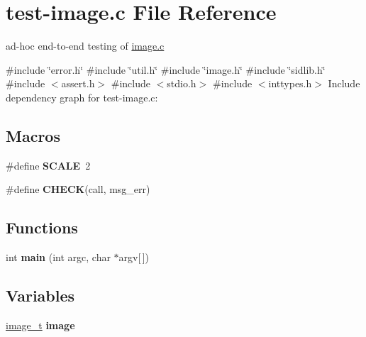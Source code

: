 \hypertarget{test-image_8c}{}\section{test-\/image.c File Reference}
\label{test-image_8c}


ad-\/hoc end-\/to-\/end testing of \hyperlink{image_8c}{image.\+c}  


{\ttfamily \#include \char`\"{}error.\+h\char`\"{}}\newline
{\ttfamily \#include \char`\"{}util.\+h\char`\"{}}\newline
{\ttfamily \#include \char`\"{}image.\+h\char`\"{}}\newline
{\ttfamily \#include \char`\"{}sidlib.\+h\char`\"{}}\newline
{\ttfamily \#include $<$assert.\+h$>$}\newline
{\ttfamily \#include $<$stdio.\+h$>$}\newline
{\ttfamily \#include $<$inttypes.\+h$>$}\newline
Include dependency graph for test-\/image.c\+:
\subsection*{Macros}
\begin{DoxyCompactItemize}
\item 
\mbox{\label{test-image_8c_a0cbea62f1ce2043dd08108e65ed8de1d}} 
\#define {\bfseries S\+C\+A\+LE}~2
\item 
\#define {\bfseries C\+H\+E\+CK}(call,  msg\+\_\+err)
\end{DoxyCompactItemize}
\subsection*{Functions}
\begin{DoxyCompactItemize}
\item 
\mbox{\label{test-image_8c_a0ddf1224851353fc92bfbff6f499fa97}} 
int {\bfseries main} (int argc, char $\ast$argv\mbox{[}$\,$\mbox{]})
\end{DoxyCompactItemize}
\subsection*{Variables}
\begin{DoxyCompactItemize}
\item 
\mbox{\label{test-image_8c_a9c1af52f89abe23d6219ab71bd578388}} 
\hyperlink{structimage__}{image\+\_\+t} {\bfseries image}
\end{DoxyCompactItemize}


